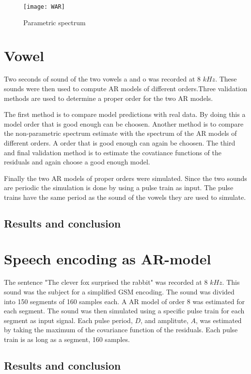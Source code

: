 \documentclass[10pt]{article}
\begin{document}
\begin{figure}[!hp]

    \begin{center}
      \texttt{[image: WAR]}
    \caption{Parametric spectrum \label{fig:WAR}}
    \end{center}

\end{figure}


\section{Vowel}
Two seconds of sound of the two vowels a and o was recorded at
8 $kHz$. These sounds were then used to compute AR models of
different orders.Three validation methods are used to determine
a proper order for the two AR models.

The first method is to compare model predictions with real data.
By doing this a model order that is good enough can be choosen.
Another method is to compare the non-parametric spectrum estimate
with the spectrum of the AR models of different orders. A order
that is good enough can again be choosen. The third and final
validation method is to estimate the covatiance functions of the
residuals and again choose a good enough model.

Finally the two AR models of proper orders were simulated. Since
the two sounds are periodic the simulation is done by using a
pulse train as input. The pulse trains have the same period as the
sound of the vowels they are used to simulate.

\subsection{Results and conclusion}

\section{Speech encoding as AR-model}
The sentence "The clever fox surprised the rabbit" was recorded at
8 $kHz$. This sound was the subject for a simplified GSM encoding.
The sound was divided into 150 segments of 160 samples each. A
AR model of order 8 was estimated for each segment. The sound was
then simulated using a specific pulse train for each segment as
input signal. Each pulse period, $D$, and amplitute, $A$, was
estimated by taking the maximum of the covariance function of the
residuals. Each pulse train is as long as a segment, 160 samples.



\subsection{Results and conclusion}
\end{document}
